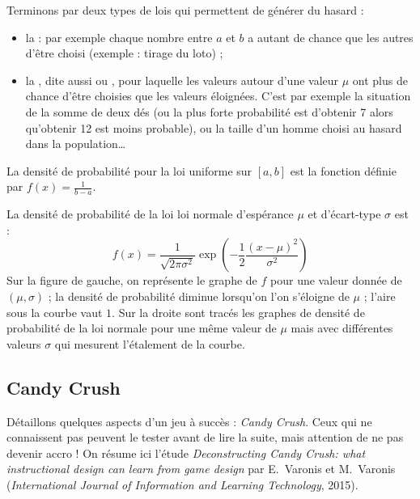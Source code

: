\documentclass[11pt,class=report,crop=false]{standalone}
\begin{document}
Terminons par deux types de lois qui permettent de générer du hasard :
\begin{itemize}
	\item la  : par exemple chaque nombre entre $a$ et $b$ a autant de chance que les autres d'être choisi (exemple : tirage du loto) ;
	\item la , dite aussi  ou , pour laquelle les valeurs autour d'une valeur $\mu$ ont plus de chance d'être choisies que les valeurs éloignées. C'est par exemple la situation de la somme de deux dés (ou la plus forte probabilité est d'obtenir 7 alors qu'obtenir 12 est moins probable), ou la taille d'un homme choisi au hasard dans la population\ldots
\end{itemize}



La densité de probabilité pour la loi uniforme sur $[a,b]$ est la fonction définie par $f(x) = \frac{1}{b-a}$.
	

La densité de probabilité de la loi loi normale d'espérance $\mu$ et d'écart-type $\sigma$ est :
	$$f(x) = \frac{1}{\sqrt{2\pi\sigma^2}} \exp\left( -\frac12 \frac{(x-\mu)^2}{\sigma^2} \right)$$
Sur la figure de gauche, on représente le graphe de $f$ pour une valeur donnée de $(\mu,\sigma)$ ; la densité de probabilité diminue lorsqu'on l'on s'éloigne de $\mu$ ; l'aire sous la courbe vaut $1$.
Sur la droite sont tracés les graphes de densité de probabilité de la loi normale pour une même valeur de $\mu$ mais avec différentes valeurs $\sigma$ qui mesurent l'étalement de la courbe.


\subsection{Candy Crush}

Détaillons quelques aspects d'un jeu à succès : \emph{Candy Crush}.
Ceux qui ne connaissent pas peuvent le tester avant de lire la suite, mais attention de ne pas devenir accro !
On résume ici l'étude \emph{Deconstructing Candy Crush: what instructional design can learn from game design} par E.~Varonis et M.~Varonis (\emph{International Journal of Information and Learning Technology}, 2015).
\end{document}
